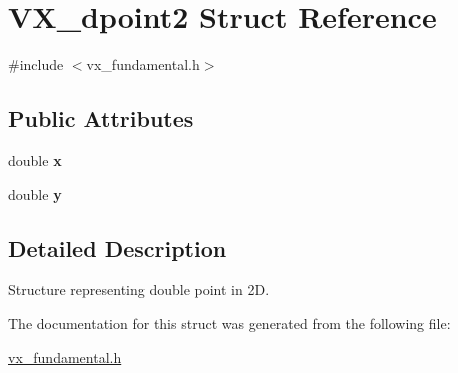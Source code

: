\hypertarget{structVX__dpoint2}{\section{V\-X\-\_\-dpoint2 Struct Reference}
\label{structVX__dpoint2}
}


{\ttfamily \#include $<$vx\-\_\-fundamental.\-h$>$}

\subsection*{Public Attributes}
\begin{DoxyCompactItemize}
\item 
\hypertarget{structVX__dpoint2_a0ab3f0eca02371b8bfc191c8ad15a3d1}{double {\bfseries x}}\label{structVX__dpoint2_a0ab3f0eca02371b8bfc191c8ad15a3d1}

\item 
\hypertarget{structVX__dpoint2_a5f92d8d8be972c46da8a577c1d3e43fc}{double {\bfseries y}}\label{structVX__dpoint2_a5f92d8d8be972c46da8a577c1d3e43fc}

\end{DoxyCompactItemize}


\subsection{Detailed Description}
Structure representing double point in 2\-D. 

The documentation for this struct was generated from the following file\-:\begin{DoxyCompactItemize}
\item 
\hyperlink{vx__fundamental_8h}{vx\-\_\-fundamental.\-h}\end{DoxyCompactItemize}
